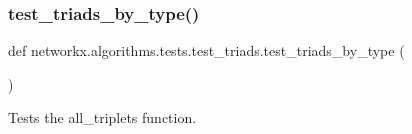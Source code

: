 \subsubsection{\texorpdfstring{test\+\_\+triads\+\_\+by\+\_\+type()}{test\_triads\_by\_type()}}
{\footnotesize\ttfamily def networkx.\+algorithms.\+tests.\+test\+\_\+triads.\+test\+\_\+triads\+\_\+by\+\_\+type (\begin{DoxyParamCaption}{ }\end{DoxyParamCaption})}

\begin{DoxyVerb}Tests the all_triplets function.\end{DoxyVerb}
 